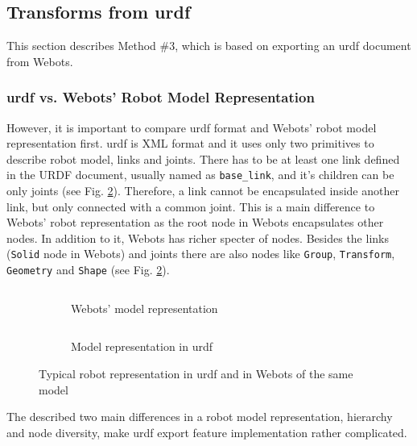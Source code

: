 \subsection{Transforms from \acs{urdf}}
This section describes Method \#3, which is based on exporting an \ac{urdf} document from Webots. 

\subsubsection{\acs{urdf} vs. Webots' Robot Model Representation}
However, it is important to compare \ac{urdf} format and Webots' robot model representation first.
\ac{urdf} is XML format and it uses only two primitives to describe robot model, links and joints.
There has to be at least one link defined in the URDF document, usually named as \texttt{base\_link}, and it's children can be only joints \cite{noauthor_urdf_nodate} (see Fig. \ref{fig:generalization:urdf_vs_webots:urdf}).
Therefore, a link cannot be encapsulated inside another link, but only connected with a common joint.
This is a main difference to Webots' robot representation as the root node in Webots encapsulates other nodes.
In addition to it, Webots has richer specter of nodes.
Besides the links (\texttt{Solid} node in Webots) and joints there are also nodes like \texttt{Group}, \texttt{Transform}, \texttt{Geometry} and \texttt{Shape} (see Fig. \ref{fig:generalization:urdf_vs_webots:urdf}).

\begin{figure}[H]
\centering
\begin{subfigure}{.5\textwidth}
  \centering
  \inputminted{c}{generalization/data/simple.proto}
  \caption{Webots' model representation}
  \label{fig:generalization:urdf_vs_webots:webots}
\end{subfigure}%
\begin{subfigure}{.5\textwidth}
  \centering
  \inputminted[fontsize=\footnotesize]{xml}{generalization/data/simple.urdf}
  \caption{Model representation in \ac{urdf}}
  \label{fig:generalization:urdf_vs_webots:urdf}
\end{subfigure}
\caption{Typical robot representation in \ac{urdf} and in Webots of the same model}
\label{fig:generalization:urdf_vs_webots}
\end{figure}

The described two main differences in a robot model representation, hierarchy and node diversity, make \ac{urdf} export feature implementation rather complicated. 

